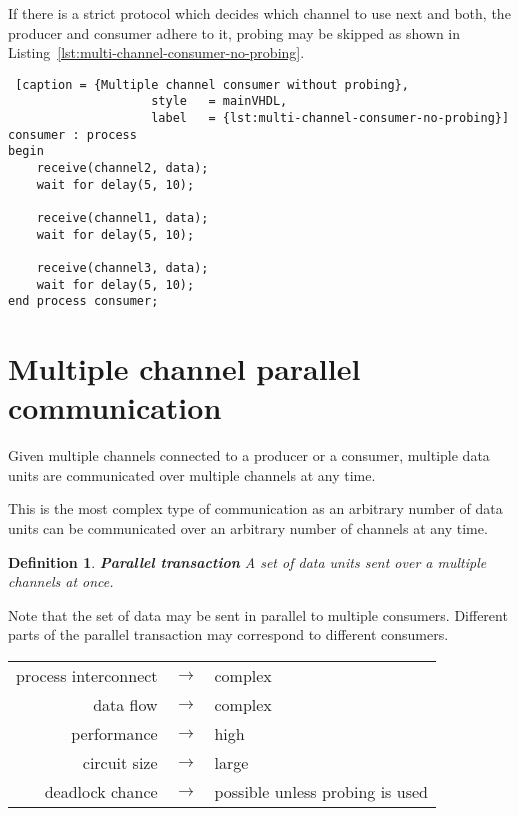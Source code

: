 \documentclass{report}
\newtheorem{definition}{Definition}[section]
\begin{document}
If there is a strict protocol which decides which channel to use next and both,
the producer and consumer adhere to it, probing may be skipped as shown in
Listing~\ref{lst:multi-channel-consumer-no-probing}.

\begin{lstlisting} [caption = {Multiple channel consumer without probing},
                    style   = mainVHDL,
                    label   = {lst:multi-channel-consumer-no-probing}]
consumer : process
begin
    receive(channel2, data);
    wait for delay(5, 10);

    receive(channel1, data);
    wait for delay(5, 10);

    receive(channel3, data);
    wait for delay(5, 10);
end process consumer;

\end{lstlisting}


\section{Multiple channel parallel communication}

Given multiple channels connected to a producer or a consumer, multiple data
units are communicated over multiple channels at any time.

This is the most complex type of communication as an arbitrary number of data
units can be communicated over an arbitrary number of channels at any time.

\begin{definition}{\textbf{Parallel transaction}}
    A set of data units sent over a multiple channels at once.
\end{definition}

Note that the set of data may be sent in parallel to multiple consumers.
Different parts of the parallel transaction may correspond to different
consumers.

\begin{table}[H]
    \centering
    \begin{tabular}{r c l}
        process interconnect & $\rightarrow$ & complex \\
        data flow            & $\rightarrow$ & complex \\
        performance          & $\rightarrow$ & high \\
        circuit size         & $\rightarrow$ & large \\
        deadlock chance      & $\rightarrow$ & possible unless probing is used \\
    \end{tabular}
\end{table}
\end{document}
